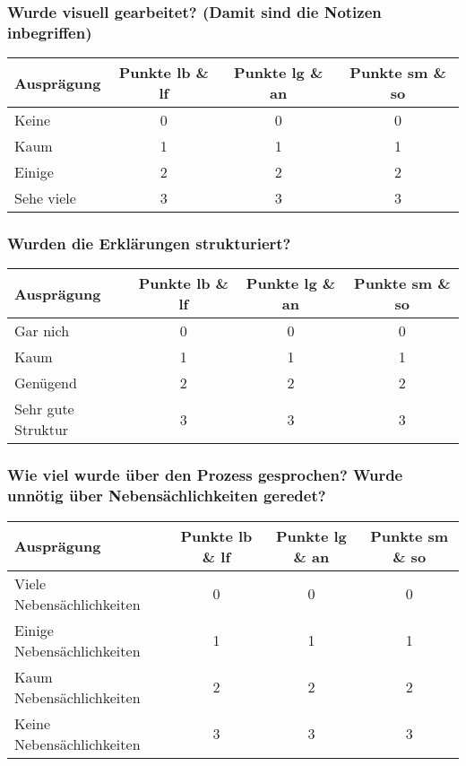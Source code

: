 \subsubsection{Wurde visuell gearbeitet? (Damit sind die Notizen inbegriffen)}
\begin{tabular}{| l | c | c | c |}
  \hline	
  \textbf{Ausprägung} & \textbf{Punkte lb \& lf} & \textbf{Punkte lg \& an} & \textbf{Punkte sm \& so} \\
  \hline  		
  Keine & 0  & 0 & 0 \\ 
  \hline
  Kaum & 1 & 1 & 1 \\ 
  \hline
  Einige & 2 & 2 & 2 \\
  \hline  
  Sehe viele & 3 & 3 & 3 \\
  \hline  
\end{tabular}

\subsubsection{Wurden die Erklärungen strukturiert?}
\begin{tabular}{| l | c | c | c |}
  \hline	
  \textbf{Ausprägung} & \textbf{Punkte lb \& lf} & \textbf{Punkte lg \& an} & \textbf{Punkte sm \& so} \\
  \hline  		
  Gar nich & 0  & 0 & 0 \\ 
  \hline
  Kaum & 1 & 1 & 1 \\ 
  \hline
  Genügend & 2 & 2 & 2 \\
  \hline  
  Sehr gute Struktur & 3 & 3 & 3 \\
  \hline  
\end{tabular}

\subsubsection{Wie viel wurde über den Prozess gesprochen? Wurde unnötig über Nebensächlichkeiten geredet?}
\begin{tabular}{| l | c | c | c |}
  \hline	
  \textbf{Ausprägung} & \textbf{Punkte lb \& lf} & \textbf{Punkte lg \& an} & \textbf{Punkte sm \& so} \\
  \hline  		
  Viele Nebensächlichkeiten & 0  & 0 & 0 \\ 
  \hline
  Einige Nebensächlichkeiten & 1 & 1 & 1 \\ 
  \hline
  Kaum Nebensächlichkeiten & 2 & 2 & 2 \\
  \hline  
  Keine Nebensächlichkeiten & 3 & 3 & 3 \\
  \hline  
\end{tabular}

